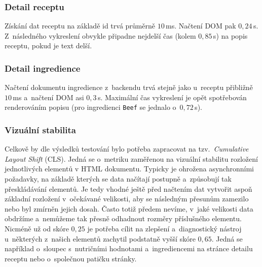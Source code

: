 \subsubsection{Detail receptu}

Získání dat receptu na základě id trvá průměrně $10\,$ms. Načtení DOM pak $0,24\,$s. Z~následného vykreslení obvykle připadne nejdelší čas (kolem $0,85\,$s) na popis receptu, pokud je text delší.

\subsubsection{Detail ingredience}

Načtení dokumentu ingredience z~backendu trvá stejně jako u~receptu přibližně $10\,$ms a~načtení DOM asi $0,3\,$s. Maximální čas vykreslení je opět spotřebován renderováním popisu (pro ingredienci \texttt{Beef} se jednalo o~$0,72\,$s).

\subsubsection{Vizuální stabilita}

Celkově by dle výsledků testování bylo potřeba zapracovat na tzv.~\emph{Cumulative Layout Shift} (CLS). Jedná se o~metriku zaměřenou na vizuální stabilitu rozložení jednotlivých elementů v HTML dokumentu. Typicky je ohrožena asynchronními požadavky, na základě kterých se data načítají postupně a~způsobují tak přeskládávání elementů. Je tedy vhodné ještě před načtením dat vytvořit aspoň základní rozložení v~očekávané velikosti, aby se následným přesunům zamezilo nebo byl zmírněn jejich dosah. Často totiž předem nevíme, v~jaké velikosti data obdržíme a~nemůžeme tak přesně odhadnout rozměry příslušného elementu. Nicméně už od skóre $0,25$ je potřeba cílit na zlepšení \citep{cls-metric} a~diagnostický nástroj u~některých z~našich elementů zachytil podstatně vyšší skóre $0,65$. Jedná se například o~sloupec s~nutričními hodnotami a~ingrediencemi na stránce detailu receptu nebo o~společnou patičku stránky.